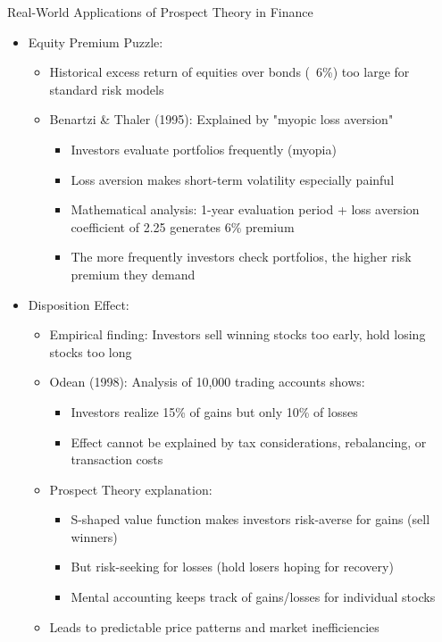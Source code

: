 \documentclass[10pt,handout]{beamer}
\begin{document}
\begin{frame}{Real-World Applications of Prospect Theory in Finance}
  \begin{itemize}[<+->]
    \item Equity Premium Puzzle:
      \begin{itemize}
        \item Historical excess return of equities over bonds (~6\%) too large for standard risk models
        \item Benartzi \& Thaler (1995): Explained by "myopic loss aversion"
          \begin{itemize}
            \item Investors evaluate portfolios frequently (myopia)
            \item Loss aversion makes short-term volatility especially painful
            \item Mathematical analysis: 1-year evaluation period + loss aversion coefficient of 2.25 generates 6\% premium
            \item The more frequently investors check portfolios, the higher risk premium they demand
          \end{itemize}
      \end{itemize}
    \item Disposition Effect:
      \begin{itemize}
        \item Empirical finding: Investors sell winning stocks too early, hold losing stocks too long
        \item Odean (1998): Analysis of 10,000 trading accounts shows:
          \begin{itemize}
            \item Investors realize 15\% of gains but only 10\% of losses
            \item Effect cannot be explained by tax considerations, rebalancing, or transaction costs
          \end{itemize}
        \item Prospect Theory explanation:
          \begin{itemize}
            \item S-shaped value function makes investors risk-averse for gains (sell winners)
            \item But risk-seeking for losses (hold losers hoping for recovery)
            \item Mental accounting keeps track of gains/losses for individual stocks
          \end{itemize}
        \item Leads to predictable price patterns and market inefficiencies
      \end{itemize}
  \end{itemize}
\end{frame}
\end{document}
